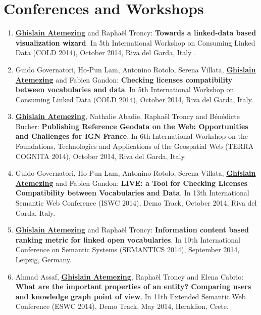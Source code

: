 \section*{Conferences and Workshops}\label{sec:conf}
\begin{enumerate}
 \item \underline{\textbf{Ghislain Atemezing}} and Rapha{\"e}l Troncy: \textbf{{T}owards a linked-data based visualization wizard}. In 5th {I}nternational {W}orkshop on {C}onsuming {L}inked {D}ata (COLD 2014), {O}ctober 2014, {R}iva del {G}arda, {I}taly .

 \item {G}uido {G}overnatori, {H}o-{P}un {L}am, {A}ntonino {R}otolo, {S}erena {V}illata, \underline{\textbf{{G}hislain {A}temezing}} and {F}abien {G}andon: \textbf{{C}hecking licenses compatibility between vocabularies and data}. In 5th {I}nternational {W}orkshop on {C}onsuming {L}inked {D}ata (COLD 2014), {O}ctober 2014, {R}iva del {G}arda, {I}taly.

 \item \underline{\textbf{{G}hislain {A}temezing}}, {N}athalie {A}badie, {R}apha{\"e}l {T}roncy and {B}{\'e}n{\'e}dicte {B}ucher: \textbf{{P}ublishing Reference Geodata on the Web: {O}pportunities and Challenges for {IGN} {F}rance}. In 6th {I}nternational {W}orkshop on the {F}oundations, {T}echnologies and {A}pplications of the {G}eospatial {W}eb (TERRA COGNITA 2014), {O}ctober 2014, {R}iva del {G}arda, {I}taly.

 \item {G}uido {G}overnatori, {H}o-{P}un {L}am, {A}ntonino {R}otolo, {S}erena {V}illata, \underline{\textbf{{G}hislain {A}temezing}} and {F}abien {G}andon: \textbf{LIVE: a Tool for Checking Licenses Compatibility between Vocabularies and Data}. In 13th International Semantic Web Conference (ISWC 2014), Demo Track, {O}ctober 2014, {R}iva del {G}arda, {I}taly.

 \item \underline{\textbf{Ghislain Atemezing}} and Rapha{\"e}l Troncy: \textbf{{I}nformation content based ranking metric for linked open vocabularies}. In 10th {I}nternational {C}onference on {S}emantic {S}ystems (SEMANTICS 2014), {S}eptember 2014, {L}eipzig, {G}ermany.

 \item {A}hmad {A}ssaf, \underline{\textbf{Ghislain Atemezing}}, {R}apha{\"e}l {T}roncy and {E}lena {C}abrio: \textbf{{W}hat are the important properties of an entity? {C}omparing users and knowledge graph point of view}. In 11th {E}xtended {S}emantic {W}eb {C}onference (ESWC 2014), Demo Track, May 2014, {H}eraklion, {C}rete.


\end{enumerate}
